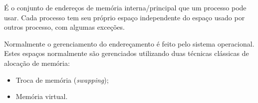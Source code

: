 


\begin{frame}{\insertlecture}
	É o conjunto de endereços de memória interna/principal
	que um processo pode usar.
	Cada processo tem seu próprio espaço independente
	do espaço usado por outros processo, com algumas
	exceções.
	
	Normalmente o gerenciamento do endereçamento \'e
	feito pelo sistema operacional.	
	\pause\\
	Estes espaços normalmente são gerenciados utilizando duas
	técnicas clássicas de alocação de memória:
	\begin{itemize}
		\item Troca de memória ({\em swapping});
		\item Memória virtual.
	\end{itemize}	
\end{frame}


